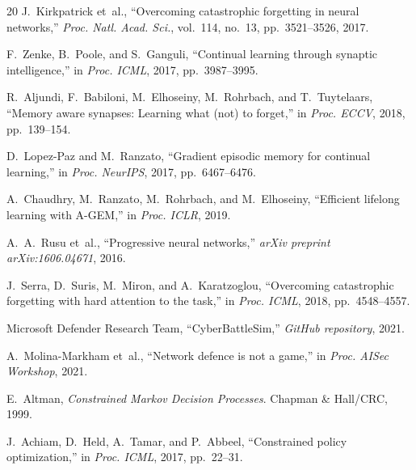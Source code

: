 \documentclass[12pt,a4paper]{article}
\theoremstyle{definition}
\begin{document}
\begin{thebibliography}{20}
J.~Kirkpatrick et~al., ``Overcoming catastrophic forgetting in neural networks,''
\textit{Proc. Natl. Acad. Sci.}, vol.~114, no.~13, pp.~3521--3526, 2017.

F.~Zenke, B.~Poole, and S.~Ganguli, ``Continual learning through synaptic intelligence,''
in \textit{Proc. ICML}, 2017, pp.~3987--3995.

R.~Aljundi, F.~Babiloni, M.~Elhoseiny, M.~Rohrbach, and T.~Tuytelaars,
``Memory aware synapses: Learning what (not) to forget,''
in \textit{Proc. ECCV}, 2018, pp.~139--154.

D.~Lopez-Paz and M.~Ranzato, ``Gradient episodic memory for continual learning,''
in \textit{Proc. NeurIPS}, 2017, pp.~6467--6476.

A.~Chaudhry, M.~Ranzato, M.~Rohrbach, and M.~Elhoseiny,
``Efficient lifelong learning with A-GEM,''
in \textit{Proc. ICLR}, 2019.

A.~A.~Rusu et~al., ``Progressive neural networks,''
\textit{arXiv preprint arXiv:1606.04671}, 2016.

J.~Serra, D.~Suris, M.~Miron, and A.~Karatzoglou,
``Overcoming catastrophic forgetting with hard attention to the task,''
in \textit{Proc. ICML}, 2018, pp.~4548--4557.

Microsoft Defender Research Team, ``CyberBattleSim,''
\textit{GitHub repository}, 2021.

A.~Molina-Markham et~al., ``Network defence is not a game,''
in \textit{Proc. AISec Workshop}, 2021.

E.~Altman, \textit{Constrained Markov Decision Processes}.
Chapman \& Hall/CRC, 1999.

J.~Achiam, D.~Held, A.~Tamar, and P.~Abbeel,
``Constrained policy optimization,''
in \textit{Proc. ICML}, 2017, pp.~22--31.
\end{thebibliography}
\end{document}

